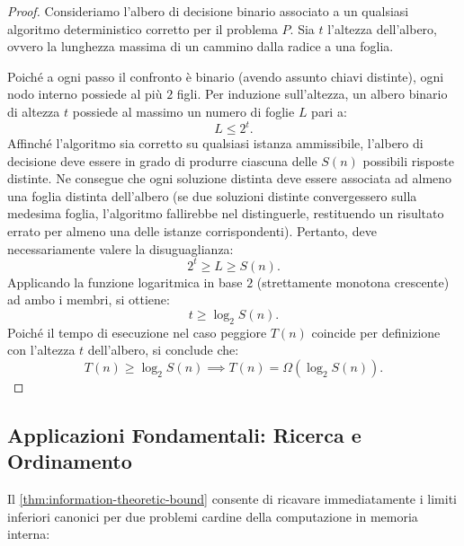 \begin{proof}
Consideriamo l'albero di decisione binario associato a un qualsiasi algoritmo deterministico corretto per il problema $P$. Sia $t$ l'altezza dell'albero, ovvero la lunghezza massima di un cammino dalla radice a una foglia.

Poiché a ogni passo il confronto è binario (avendo assunto chiavi distinte), ogni nodo interno possiede al più $2$ figli. Per induzione sull'altezza, un albero binario di altezza $t$ possiede al massimo un numero di foglie $L$ pari a:
\begin{equation}
  L \le 2^t.
\end{equation}
Affinché l'algoritmo sia corretto su qualsiasi istanza ammissibile, l'albero di decisione deve essere in grado di produrre ciascuna delle $S(n)$ possibili risposte distinte. Ne consegue che ogni soluzione distinta deve essere associata ad almeno una foglia distinta dell'albero (se due soluzioni distinte convergessero sulla medesima foglia, l'algoritmo fallirebbe nel distinguerle, restituendo un risultato errato per almeno una delle istanze corrispondenti). Pertanto, deve necessariamente valere la disuguaglianza:
\begin{equation}
  2^t \ge L \ge S(n).
\end{equation}
Applicando la funzione logaritmica in base $2$ (strettamente monotona crescente) ad ambo i membri, si ottiene:
\begin{equation}
  t \ge \log_2 S(n).
\end{equation}
Poiché il tempo di esecuzione nel caso peggiore $T(n)$ coincide per definizione con l'altezza $t$ dell'albero, si conclude che:
\begin{equation}
  T(n) \ge \log_2 S(n) \implies T(n) = \Omega(\log_2 S(n)).
\end{equation}
\end{proof}

\FloatBarrier
\subsection{Applicazioni Fondamentali: Ricerca e Ordinamento}
\label{subsec:search-and-sort-applications}

Il \autoref{thm:information-theoretic-bound} consente di ricavare immediatamente i limiti inferiori canonici per due problemi cardine della computazione in memoria interna:

